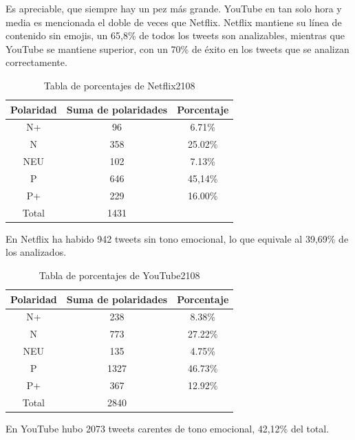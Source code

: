Es apreciable, que siempre hay un pez más grande. YouTube en tan solo hora y media es mencionada el doble de veces que Netflix.  Netflix mantiene su línea de contenido sin emojis, un 65,8\% de todos los tweets son analizables, mientras que YouTube se mantiene superior, con un 70\% de éxito en los tweets que se analizan correctamente. 



\begin{table}[H]
	\centering
	\begin{tabular}{|c|c|c|}
		\hline 
		Polaridad& Suma de polaridades & Porcentaje \\ 
		\hline 
		N+& 96 & 6.71\% \\ 
		\hline 
		N& 358 &  25.02\%\\ 
		\hline 
		NEU& 102 & 7.13\% \\ 
		\hline 
		P& 646 & 45,14\% \\ 
		\hline 
		P+& 229 & 16.00\% \\ 
		\hline 
		Total & 1431 & \\
		\hline
	\end{tabular} 
	\caption{Tabla de porcentajes de Netflix2108}
	\label{tbl:porcentaje-Netflix2108}
\end{table}

En Netflix ha habido 942 tweets sin tono emocional, lo que equivale al 39,69\% de los analizados. 

\begin{table}[H]
	\centering
	\begin{tabular}{|c|c|c|}
		\hline 
		Polaridad& Suma de polaridades & Porcentaje \\ 
		\hline 
		N+& 238 & 8.38\% \\ 
		\hline 
		N& 773 &  27.22\%\\ 
		\hline 
		NEU& 135 & 4.75\% \\ 
		\hline 
		P& 1327 & 46.73\% \\ 
		\hline 
		P+& 367 & 12.92\% \\ 
		\hline 
		Total & 2840 & \\
		\hline
	\end{tabular} 
	\caption{Tabla de porcentajes de YouTube2108}
	\label{tbl:porcentaje-YT2108}
\end{table}

En YouTube hubo 2073 tweets carentes de tono emocional, 42,12\% del total. 



